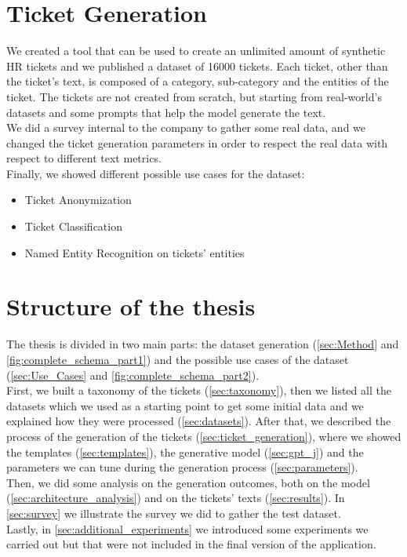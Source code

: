 \section{Ticket Generation}
We created a tool that can be used to create an unlimited amount of synthetic HR tickets and we published a dataset of 16000 tickets. Each ticket, other than the ticket's text, is composed of a category, sub-category and the entities of the ticket. The tickets are not created from scratch, but starting from real-world's datasets and some prompts that help the model generate the text. \\
We did a survey internal to the company to gather some real data, and we changed the ticket generation parameters in order to respect the real data with respect to different text metrics. \\
Finally, we showed different possible use cases for the dataset:
\begin{itemize}
    \item Ticket Anonymization
    \item Ticket Classification
    \item Named Entity Recognition on tickets' entities
\end{itemize}

\section{Structure of the thesis}
The thesis is divided in two main parts: the dataset generation (\autoref{sec:Method} and \autoref{fig:complete_schema_part1}) and the possible use cases of the dataset (\autoref{sec:Use_Cases} and \autoref{fig:complete_schema_part2}).\\

First, we built a taxonomy of the tickets (\autoref{sec:taxonomy}), then we listed all the datasets which we used as a starting point to get some initial data and we explained how they were processed (\autoref{sec:datasets}). After that, we described the process of the generation of the tickets (\autoref{sec:ticket_generation}), where we showed the templates (\autoref{sec:templates}), the generative model (\autoref{sec:gpt_j}) and the parameters we can tune during the generation process (\autoref{sec:parameters}). \\
Then, we did some analysis on the generation outcomes, both on the model (\autoref{sec:architecture_analysis}) and on the tickets' texts (\autoref{sec:results}). In \autoref{sec:survey} we illustrate the survey we did to gather the test dataset. \\
Lastly, in \autoref{sec:additional_experiments} we introduced some experiments we carried out but that were not included in the final version of the application.\\

